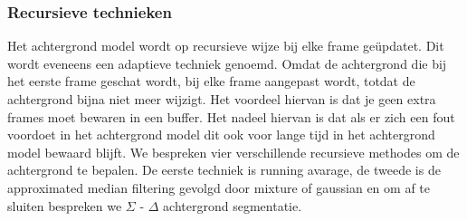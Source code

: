 \subsubsection{Recursieve technieken}
\label{refRT}
Het achtergrond model wordt op recursieve wijze bij elke frame ge\"updatet. Dit wordt eveneens een adaptieve techniek genoemd. Omdat de achtergrond die bij het eerste frame geschat wordt, bij elke frame aangepast wordt, totdat de achtergrond bijna niet meer wijzigt. Het voordeel hiervan is dat je geen extra frames moet bewaren in een buffer. Het nadeel hiervan is dat als er zich een fout voordoet in het achtergrond model dit ook voor lange tijd in het achtergrond model bewaard blijft. We bespreken vier verschillende recursieve methodes om de achtergrond te bepalen. De eerste techniek is running avarage,  de tweede is de approximated median filtering gevolgd door mixture of gaussian en om af te sluiten bespreken we $\Sigma$ - $\Delta$ achtergrond segmentatie.


